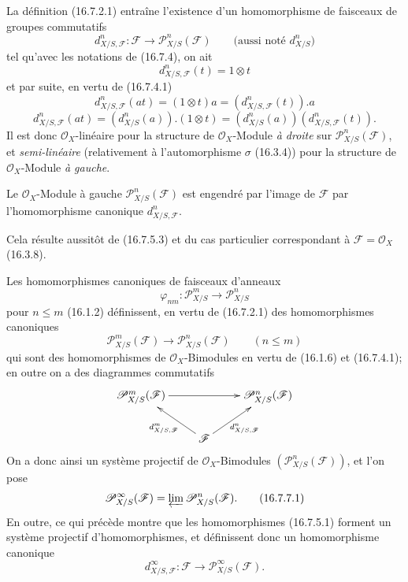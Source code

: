 \begin{env}[16.7.5]
\label{IV.16.7.5}
La définition (16.7.2.1) entraîne l'existence d'un homomorphisme de faisceaux
de groupes commutatifs
\[
  d_{X/S,\mathscr{F}}^n:\mathscr{F}
  \longrightarrow\mathscr{P}_{X/S}^n(\mathscr{F})
  \qquad\text{(aussi noté $d_{X/S}^n$)}
  \tag{16.7.5.1}
  \label{IV.16.7.5.1}
\]
tel qu'avec les notations de (16.7.4), on ait
\[
  d_{X/S,\mathscr{F}}^n(t)=1\otimes t
  \tag{16.7.5.2}
  \label{IV.16.7.5.2}
\]
et par suite, en vertu de (16.7.4.1)
\[
  d_{X/S,\mathscr{F}}^n(at)
  =(1\otimes t)a=(d_{X/S,\mathscr{F}}^n(t)).a
  \tag{16.7.5.3}
  \label{IV.16.7.5.3}
\]
\[
  d_{X/S,\mathscr{F}}^n(at)
  =(d_{X/S}^n(a)).(1\otimes t)
  =(d_{X/S}^n(a))(d_{X/S,\mathscr{F}}^n(t)).
  \tag{16.7.5.4}
  \label{IV.16.7.5.4}
\]
Il est donc $\mathcal{O}_X$-linéaire pour la structure de
$\mathcal{O}_X$-Module \emph{à droite} sur $\mathscr{P}_{X/S}^n(\mathscr{F})$, et
\emph{semi-linéaire} (relativement à l'automorphisme $\sigma$ (16.3.4)) pour
la structure de $\mathcal{O}_X$-Module \emph{à gauche}.
\end{env}

\begin{proposition}[16.7.6]
\label{IV.16.7.6}
Le $\mathcal{O}_X$-Module à gauche $\mathscr{P}_{X/S}^n(\mathscr{F})$ est
engendré par l'image de $\mathscr{F}$ par l'homomorphisme canonique
$d_{X/S,\mathscr{F}}^n$.
\end{proposition}

Cela résulte aussitôt de (16.7.5.3) et du cas particulier correspondant à
$\mathscr{F}=\mathcal{O}_X$ (16.3.8).

\begin{env}[16.7.7]
\label{IV.16.7.7}
Les homomorphismes canoniques de faisceaux d'anneaux
\[
  \varphi_{nm}:\mathscr{P}_{X/S}^m\longrightarrow\mathscr{P}_{X/S}^n
\]
pour $n\leq m$ (16.1.2) définissent, en vertu de (16.7.2.1) des
homomorphismes canoniques
\[
  \mathscr{P}_{X/S}^m(\mathscr{F})
  \longrightarrow\mathscr{P}_{X/S}^n(\mathscr{F})\qquad(n\leq m)
\]
qui sont des homomorphismes de $\mathcal{O}_X$-Bimodules en vertu de (16.1.6)
et (16.7.4.1); en outre on a des diagrammes commutatifs
\[
  \xymatrix{
    \mathscr{P}_{X/S}^m(\mathscr{F})\ar[rr]
      &&\mathscr{P}_{X/S}^n(\mathscr{F})\\
    &\mathscr{F}\ar[ul]^-{d_{X/S,\mathscr{F}}^m}
      \ar[ur]_-{d_{X/S,\mathscr{F}}^n}
  }
\]
On a donc ainsi un système projectif de $\mathcal{O}_X$-Bimodules
$(\mathscr{P}_{X/S}^n(\mathscr{F}))$, et l'on pose
\[
  \mathscr{P}_{X/S}^{\infty}(\mathscr{F})
  =\varprojlim\mathscr{P}_{X/S}^n(\mathscr{F}).
  \tag{16.7.7.1}
  \label{IV.16.7.7.1}
\]
En outre, ce qui précède montre que les homomorphismes (16.7.5.1) forment un
système projectif d'homomorphismes, et définissent donc un homomorphisme
canonique
\[
  d_{X/S,\mathscr{F}}^{\infty}:\mathscr{F}
  \longrightarrow\mathscr{P}_{X/S}^{\infty}(\mathscr{F}).
  \tag{16.7.7.2}
  \label{IV.16.7.7.2}
\]
\end{env}

